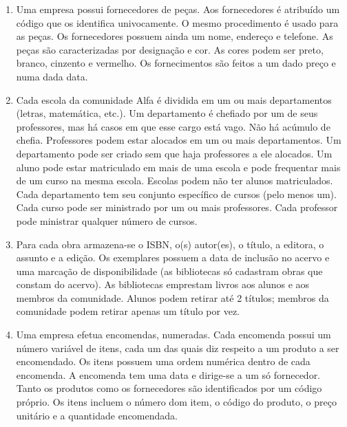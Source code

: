 \begin{enumerate}
	\item Uma empresa possui fornecedores de peças. Aos fornecedores é atribuído um código que os identifica univocamente. O mesmo procedimento é usado para as peças. Os fornecedores possuem ainda um nome, endereço e telefone. As peças são caracterizadas por designação e cor. As cores podem ser preto, branco, cinzento e vermelho. Os fornecimentos são feitos a um dado preço e numa dada data.
	\item Cada escola da comunidade Alfa é dividida em um ou mais departamentos (letras, matemática, etc.). Um departamento é chefiado por um de seus professores, mas há casos em que esse cargo está vago. Não há acúmulo de chefia. Professores podem estar alocados em um ou mais departamentos. Um departamento pode ser criado sem que haja professores a ele alocados. Um aluno pode estar matriculado em mais de uma escola e pode frequentar mais de um curso na mesma escola. Escolas podem não ter alunos matriculados. Cada departamento tem seu conjunto específico de cursos (pelo menos um). Cada curso pode ser ministrado por um ou mais professores. Cada professor pode ministrar qualquer número de cursos.
	\item Para cada obra armazena-se o ISBN, o(s) autor(es), o título, a editora, o assunto e a edição. Os exemplares possuem a data de inclusão no acervo e uma marcação de disponibilidade (as bibliotecas só cadastram obras que constam do acervo).
	As bibliotecas emprestam livros aos alunos e aos membros da comunidade. Alunos podem retirar até 2 títulos; membros da comunidade podem retirar apenas um título por vez.
	\item Uma empresa efetua encomendas, numeradas. Cada encomenda possui um número variável de itens, cada um das quais diz respeito a um produto a ser encomendado. Os itens possuem uma ordem numérica dentro de cada encomenda. A encomenda tem uma data e dirige-se a um só fornecedor. Tanto os produtos como os fornecedores são identificados por um código próprio. Os itens incluem o número dom item, o código do produto, o preço unitário e a quantidade encomendada.
\end{enumerate}